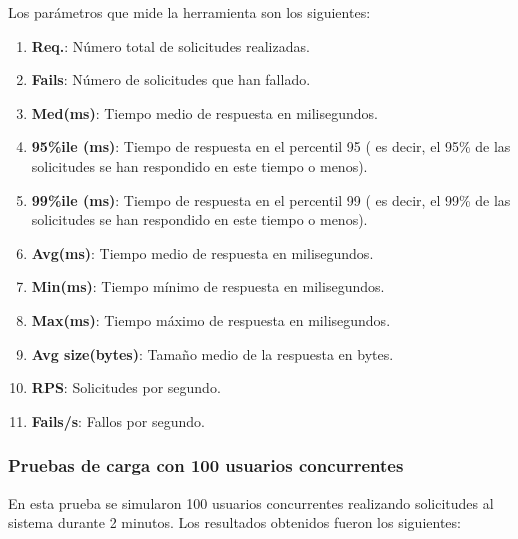 Los parámetros que mide la herramienta son los siguientes:
\begin{enumerate}
    \item \textbf{Req.}: Número total de solicitudes realizadas.
    \item \textbf{Fails}: Número de solicitudes que han fallado.
    \item \textbf{Med(ms)}: Tiempo medio de respuesta en milisegundos.
    \item \textbf{95\%ile (ms)}: Tiempo de respuesta en el percentil 95 ( es decir, el 95\% de las solicitudes se han respondido en este tiempo o menos).
    \item \textbf{99\%ile (ms)}: Tiempo de respuesta en el percentil 99 ( es decir, el 99\% de las solicitudes se han respondido en este tiempo o menos).
    \item \textbf{Avg(ms)}: Tiempo medio de respuesta en milisegundos.
    \item \textbf{Min(ms)}: Tiempo mínimo de respuesta en milisegundos.
    \item \textbf{Max(ms)}: Tiempo máximo de respuesta en milisegundos.
    \item \textbf{Avg size(bytes)}: Tamaño medio de la respuesta en bytes.
    \item \textbf{RPS}: Solicitudes por segundo.
    \item \textbf{Fails/s}: Fallos por segundo.
\end{enumerate}


\subsubsection{Pruebas de carga con 100 usuarios concurrentes}

En esta prueba se simularon 100 usuarios concurrentes realizando solicitudes al sistema durante 2 minutos. Los resultados obtenidos fueron los siguientes:

\begin{table}[H]
\centering
{}
\caption{Resultados de la prueba de carga con 100 usuarios concurrentes.}
\label{tab:locust100}
\end{table}

